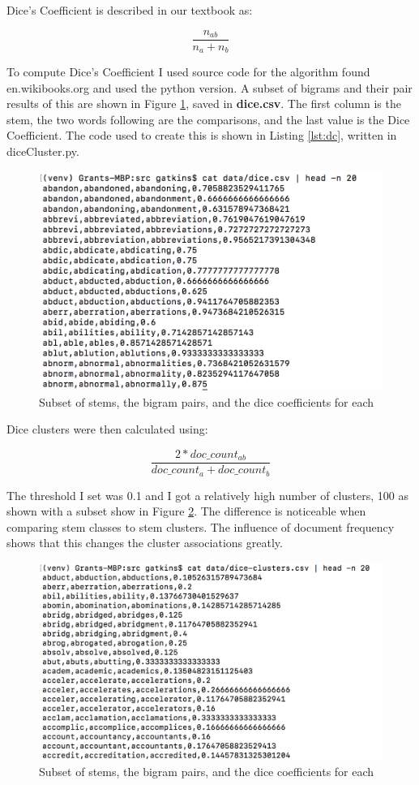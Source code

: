 \documentclass[letterpaper,11pt]{article}
\begin{document}
Dice's Coefficient is described in our textbook \cite{book} as:

\[
    \frac{n_{ab}}{n_a+n_b}
\]

To compute Dice's Coefficient I used source code for the algorithm found en.wikibooks.org \cite{wikibook} and used the python version.
A subset of bigrams and their pair results of this are shown in Figure \ref{fig:dice}, saved in \textbf{dice.csv}.
The first column is the stem, the two words following are the comparisons, and the last value is the Dice Coefficient. 
The code used to create this is shown in Listing \ref{lst:dc}, written in diceCluster.py.

\begin{figure}[h]
\centering
\includegraphics[scale=0.6]{dice.png}
\caption{Subset of stems, the bigram pairs, and the dice coefficients for each}
\label{fig:dice}
\end{figure}

Dice clusters were then calculated using:

\[
    \frac{2 * {doc\_count_{ab}}}{doc\_count_a+doc\_count_b}
\]

The threshold I set was 0.1 and I got a relatively high number of clusters, 100 as shown with a subset show in Figure \ref{fig:dicec}.
The difference is noticeable when comparing stem classes to stem clusters.
The influence of document frequency shows that this changes the cluster associations greatly.

\begin{figure}[h]
\centering
\includegraphics[scale=0.6]{dice-clusters.png}
\caption{Subset of stems, the bigram pairs, and the dice coefficients for each}
\label{fig:dicec}
\end{figure}
\end{document}
